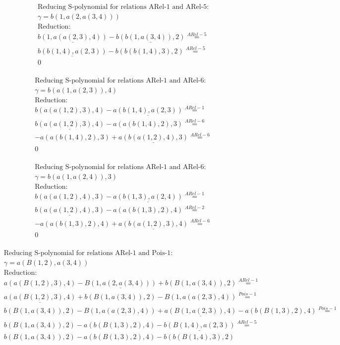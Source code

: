 \documentclass[11pt]{amsart}
\begin{document}
\begin{align*} 
& \text{Reducing S-polynomial for relations ARel-1 and ARel-5:} \\ 
& \gamma = b(1,a(2,a(3,4))) \\ 
& \text{Reduction}: \\&\underline{b(1,a(a(2,3),4))} - \underline{b(b(1,a(3,4)),2)} \stackrel{ ARel-5 }{=}  \\ 
&\underline{b(b(1,4),a(2,3))} - b(b(b(1,4),3),2) \stackrel{ ARel-5 }{=}  \\ 
&0\\ 
\end{align*} 
 
\begin{align*} 
& \text{Reducing S-polynomial for relations ARel-1 and ARel-6:} \\ 
& \gamma = b(a(1,a(2,3)),4) \\ 
& \text{Reduction}: \\&b(a(a(1,2),3),4) - \underline{a(b(1,4),a(2,3))} \stackrel{ ARel-1 }{=}  \\ 
&\underline{b(a(a(1,2),3),4)} - a(a(b(1,4),2),3) \stackrel{ ARel-6 }{=}  \\ 
& - a(a(b(1,4),2),3) + \underline{a(b(a(1,2),4),3)} \stackrel{ ARel-6 }{=}  \\ 
&0\\ 
\end{align*} 
 
\begin{align*} 
& \text{Reducing S-polynomial for relations ARel-1 and ARel-6:} \\ 
& \gamma = b(a(1,a(2,4)),3) \\ 
& \text{Reduction}: \\&b(a(a(1,2),4),3) - \underline{a(b(1,3),a(2,4))} \stackrel{ ARel-1 }{=}  \\ 
&\underline{b(a(a(1,2),4),3)} - a(a(b(1,3),2),4) \stackrel{ ARel-2 }{=}  \\ 
& - a(a(b(1,3),2),4) + \underline{a(b(a(1,2),3),4)} \stackrel{ ARel-6 }{=}  \\ 
&0\\ 
\end{align*} 
 
\begin{align*} 
& \text{Reducing S-polynomial for relations ARel-1 and Pois-1:} \\ 
& \gamma = a(B(1,2),a(3,4)) \\ 
& \text{Reduction}: \\&a(a(B(1,2),3),4) - \underline{B(1,a(2,a(3,4)))} + b(B(1,a(3,4)),2) \stackrel{ ARel-1 }{=}  \\ 
&\underline{a(a(B(1,2),3),4)} + b(B(1,a(3,4)),2) - B(1,a(a(2,3),4)) \stackrel{ Pois-1 }{=}  \\ 
&b(B(1,a(3,4)),2) - B(1,a(a(2,3),4)) + \underline{a(B(1,a(2,3)),4)} - a(b(B(1,3),2),4) \stackrel{ Pois-1 }{=}  \\ 
&b(B(1,a(3,4)),2) - a(b(B(1,3),2),4) - \underline{b(B(1,4),a(2,3))} \stackrel{ ARel-5 }{=}  \\ 
&b(B(1,a(3,4)),2) - a(b(B(1,3),2),4) - b(b(B(1,4),3),2)\\ 
\end{align*} 
 
\end{document}
